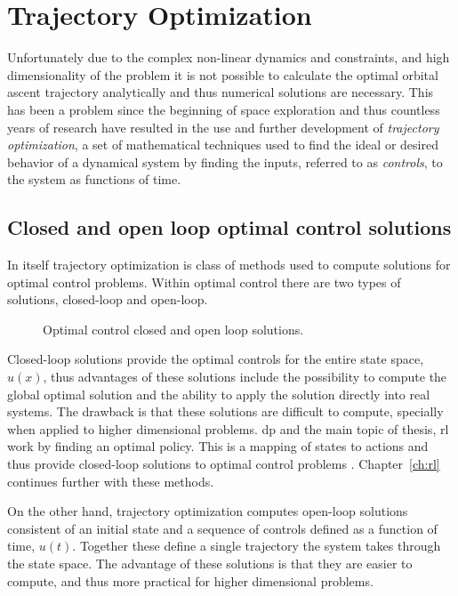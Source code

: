 \section{Trajectory Optimization}
Unfortunately due to the complex non-linear dynamics and constraints, and high dimensionality of the problem it is not possible to calculate the optimal orbital ascent trajectory analytically and thus numerical solutions are necessary. This has been a problem since the beginning of space exploration and thus countless years of research have resulted in the use and further development of \emph{trajectory optimization}, a set of mathematical techniques used to find the ideal or desired behavior of a dynamical system by finding the inputs, referred to as \emph{controls}, to the system as functions of time.

\subsection{Closed and open loop optimal control solutions}
In itself trajectory optimization is class of methods used to compute solutions for optimal control problems. Within optimal control there are two types of solutions, closed-loop and open-loop. 

\begin{figure}[ht]			
	\centering
				
	\caption{Optimal control closed and open loop solutions.}
	\label{fig:opt_control_solutions}
\end{figure}

Closed-loop solutions provide the optimal controls for the entire state space, $u(x)$, thus advantages of these solutions include the possibility to compute the global optimal solution and the ability to apply the solution directly into real systems. The drawback is that these solutions are difficult to compute, specially when applied to higher dimensional problems. \acrlong{dp} and the main topic of thesis, \acrlong{rl} work by finding an optimal policy. This is a mapping of states to actions and thus provide closed-loop solutions to optimal control problems \cite{kelly2017introduction}. Chapter~\ref{ch:rl} continues further with these methods.

On the other hand, trajectory optimization computes open-loop solutions consistent of an initial state and a sequence of controls defined as a function of time, $u(t)$. Together these define a single trajectory the system takes through the state space. The advantage of these solutions is that they are easier to compute, and thus more practical for higher dimensional problems. 


